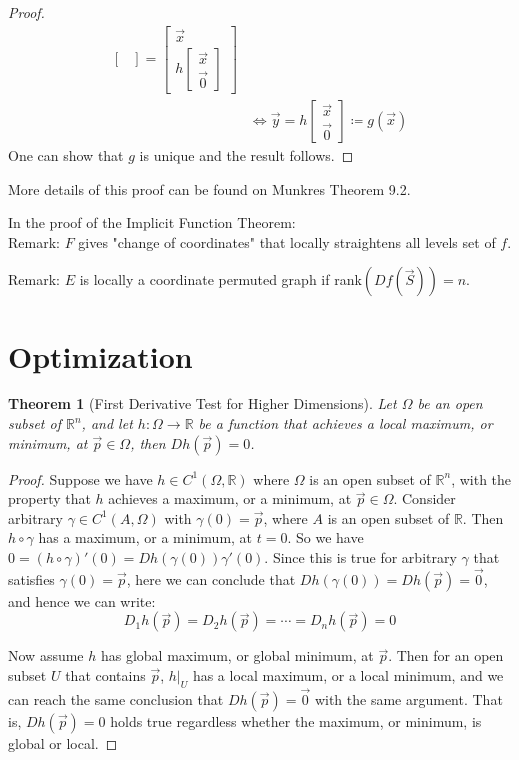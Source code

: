 \documentclass[11pt,oneside]{book}
\theoremstyle{break}
\theoremstyle{break}
\newtheorem{thm}{Theorem}[section]
\newcommand{\R}{\mathbb{R}}
\newcommand{\remark}{\color{blue}Remark: \color{black}}
\begin{document}
\begin{proof}
\begin{align*}
\begin{bmatrix}
\end{bmatrix}=\begin{bmatrix}
\vec{x} \\ h\begin{bmatrix}
\vec{x} \\ \vec{0}
\end{bmatrix}
\end{bmatrix}  \\&\iff \vec{y} = h\begin{bmatrix}
\vec{x}\\\vec{0}
\end{bmatrix}\coloneqq g(\vec{x})
\end{align*}
One can show that $g$ is unique and the result follows. 
\end{proof}
More details of this proof can be found on Munkres Theorem 9.2.
\hfill\break

In the proof of the Implicit Function Theorem:\\
\remark $F$ gives "change of coordinates" that locally straightens all levels set of $f$. 

\remark $E$ is locally a coordinate permuted graph if rank$(Df(\vec{S}))= n$.


\newpage
\section[Optimization]{\color{red} Optimization \color{black}}

\begin{thm}[First Derivative Test for Higher Dimensions]
Let $\Omega$ be an open subset of $\R^n$, and let $h: \Omega \to \R$ be a function that achieves a local maximum, or minimum, at $\vec{p}\in \Omega$, then $Dh(\vec{p}) = 0$.
\end{thm}
\begin{proof}
Suppose we have $h \in C^1(\Omega, \R)$ where $\Omega$ is an open subset of $\R^n$, with the property that $h$ achieves a maximum, or a minimum, at $\vec{p}\in \Omega$. Consider arbitrary $\gamma \in C^1(A, \Omega)$ with $\gamma(0) = \vec{p}$, where $A$ is an open subset of $\R$. Then $h\circ \gamma$ has a maximum, or a minimum, at $t=0$. So we have $0 = (h \circ \gamma)' (0) = Dh(\gamma(0))\gamma'(0)$. Since this is true for arbitrary $\gamma$ that satisfies $\gamma(0) = \vec{p}$, here we can conclude that $Dh(\gamma(0))=Dh(\vec{p}) = \vec{0}$, and hence we can write: 
$$D_1h(\vec{p}) = D_2h(\vec{p}) = \cdots  = D_nh(\vec{p}) = 0$$

Now assume $h$ has global maximum, or global minimum, at $\vec{p}$. Then for an open subset $U$ that contains $\vec{p}$, $h|_U$ has a local maximum, or a local minimum, and we can reach the same conclusion that $Dh(\vec{p}) = \vec{0}$ with the same argument. That is, $Dh(\vec{p}) = 0$ holds true regardless whether the maximum, or minimum, is global or local.
\end{proof}
\end{document}
